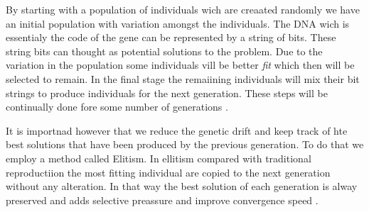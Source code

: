 By starting with a population of individuals wich are creaated randomly we have an initial population with variation amongst the individuals. The DNA wich is essentialy the code of the gene can be represented by a string of bits. These string bits can thought as potential solutions to the problem. Due to the variation in the population some individuals vill be better \textit{fit} which then will be selected to remain. In the final stage the remaiining individuals will mix their bit strings to produce individuals for the next generation. These steps will be continually done fore some number of generations \cite{forrest1996genetic}. 

It is importnad however that we reduce the genetic drift and keep track of hte best solutions that have been produced by the previous generation. To do that we employ a method called Elitism. In ellitism compared with traditional reproductiion the most fitting individual are copied to the next generation without any alteration. In that way the best solution of each generation is alway preserved and adds selective preassure and improve convergence speed \cite{du2018elitism}.






